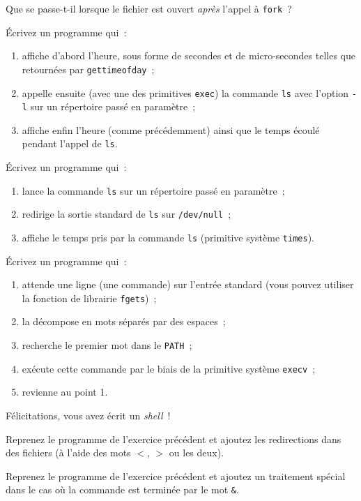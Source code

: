 Que se passe-t-il lorsque le fichier est ouvert {\em après} l'appel à
{\tt fork}~?


\question

Écrivez un programme qui~:

\begin {enumerate}
    \item affiche d'abord l'heure, sous forme de secondes et de
	micro-secondes telles que retournées par \texttt {gettimeofday}~;

    \item appelle ensuite (avec une des primitives \texttt {exec})
	la commande \texttt {ls} avec l'option \texttt {-l} sur un
	répertoire passé en paramètre~;

    \item affiche enfin l'heure (comme précédemment) ainsi que le
	temps écoulé pendant l'appel de \texttt {ls}.

\end {enumerate}


\question

Écrivez un programme qui~:

\begin {enumerate}
    \item lance la commande {\tt ls} sur un répertoire passé en
        paramètre~;
    \item redirige la sortie standard de {\tt ls} sur {\tt /dev/null}~;
    \item affiche le temps pris par la commande {\tt ls} (primitive
	système {\tt times}).
\end {enumerate}


\question

Écrivez un programme qui~:

\begin {enumerate}
    \item attende une ligne (une commande) sur l'entrée standard (vous
	pouvez utiliser la fonction de librairie {\tt fgets})~;

    \item la décompose en mots séparés par des espaces~;

    \item recherche le premier mot dans le {\tt PATH}~;

    \item exécute cette commande par le biais de la primitive système
	{\tt execv}~;
    
    \item revienne au point 1.

\end {enumerate}

Félicitations, vous avez écrit un {\em shell}~!


\question

Reprenez le programme de l'exercice précédent et ajoutez les
redirections dans des fichiers (à l'aide des mots $<$, $>$ ou les
deux).


\question
\label{q:minishell}

Reprenez le programme de l'exercice précédent et ajoutez un traitement
spécial dans le cas où la commande est terminée par le mot \verb:&:.

